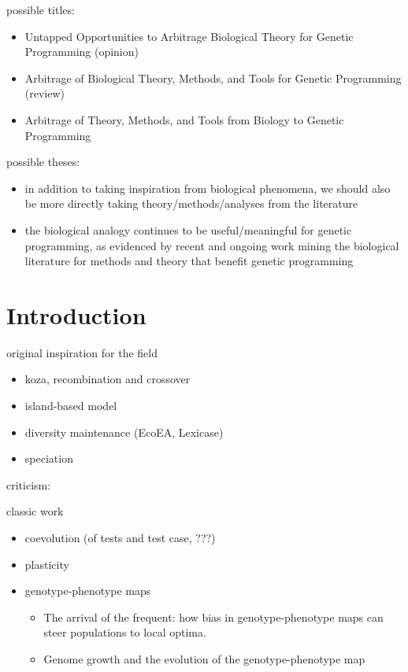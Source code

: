 possible titles:
\begin{itemize}
  \item Untapped Opportunities to Arbitrage Biological Theory for Genetic Programming (opinion)
  \item Arbitrage of Biological Theory, Methods, and Tools for Genetic Programming (review)
  \item Arbitrage of Theory, Methods, and Tools from Biology to Genetic Programming
\end{itemize}

possible theses:
\begin{itemize}
  \item in addition to taking inspiration from biological phenomena, we should also be more directly taking theory/methods/analyses from the literature
  \item the biological analogy continues to be useful/meaningful for genetic programming, as evidenced by recent and ongoing work mining the biological literature for methods and theory that benefit genetic programming
\end{itemize}

\section{Introduction} \label{sec:introduction}

original inspiration for the field
\begin{itemize}
  \item koza, recombination and crossover
  \item island-based model
  \item diversity maintenance (EcoEA, Lexicase)
  \item speciation
\end{itemize}

criticism: \citep{moore2023evolution,woodward2009evolution}

classic work
\begin{itemize}
  \item coevolution (of tests and test case, ???)
  \item plasticity
  \item genotype-phenotype maps
        \begin{itemize}
          \item The arrival of the frequent: how bias in genotype-phenotype maps can steer populations to local optima.
          \item Genome growth and the evolution of the genotype-phenotype map
        \end{itemize}
\end{itemize}

